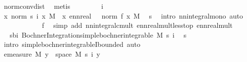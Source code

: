 \begin{isabellebody}
\ norm{\isacharunderscore}{\kern0pt}conv{\isacharunderscore}{\kern0pt}dist\ \isamarkupfalse%
\ metis\isanewline
\ \ \isacommand{{\isacharbraceleft}{\kern0pt}}\isamarkupfalse%
\isanewline
\ \ \ \ \isamarkupfalse%
\ i\isanewline
\ \ \ \ \isamarkupfalse%
\ {\isachardoublequoteopen}{\isacharparenleft}{\kern0pt}{\isasymintegral}\isactrlsup {\isacharplus}{\kern0pt}x{\isachardot}{\kern0pt}\ norm\ {\isacharparenleft}{\kern0pt}s\ i\ x{\isacharparenright}{\kern0pt}\ {\isasympartial}M{\isacharparenright}{\kern0pt}\ {\isasymle}\ {\isacharparenleft}{\kern0pt}{\isasymintegral}\isactrlsup {\isacharplus}{\kern0pt}x{\isachardot}{\kern0pt}\ ennreal\ {\isacharparenleft}{\kern0pt}{}\ {\isacharasterisk}{\kern0pt}\ norm\ {\isacharparenleft}{\kern0pt}f\ x{\isacharparenright}{\kern0pt}{\isacharparenright}{\kern0pt}\ {\isasympartial}M{\isacharparenright}{\kern0pt}{\isachardoublequoteclose}\ \isamarkupfalse%
\ s\ \isamarkupfalse%
\ {\isacharparenleft}{\kern0pt}intro\ nn{\isacharunderscore}{\kern0pt}integral{\isacharunderscore}{\kern0pt}mono{\isacharcomma}{\kern0pt}\ auto{\isacharparenright}{\kern0pt}\isanewline
\ \ \ \ \isamarkupfalse%
\ \isamarkupfalse%
\ {\isachardoublequoteopen}{\isasymdots}\ {\isacharless}{\kern0pt}\ {\isasyminfinity}{\isachardoublequoteclose}\ \isamarkupfalse%
\ f\ \isamarkupfalse%
\ {\isacharparenleft}{\kern0pt}simp\ add{\isacharcolon}{\kern0pt}\ nn{\isacharunderscore}{\kern0pt}integral{\isacharunderscore}{\kern0pt}cmult\ ennreal{\isacharunderscore}{\kern0pt}mult{\isacharunderscore}{\kern0pt}less{\isacharunderscore}{\kern0pt}top\ ennreal{\isacharunderscore}{\kern0pt}mult{\isacharparenright}{\kern0pt}\isanewline
\ \ \ \ \isamarkupfalse%
\ \isamarkupfalse%
\ sbi{\isacharcolon}{\kern0pt}\ {\isachardoublequoteopen}Bochner{\isacharunderscore}{\kern0pt}Integration{\isachardot}{\kern0pt}simple{\isacharunderscore}{\kern0pt}bochner{\isacharunderscore}{\kern0pt}integrable\ M\ {\isacharparenleft}{\kern0pt}s\ i{\isacharparenright}{\kern0pt}{\isachardoublequoteclose}\ \isamarkupfalse%
\ s\ \isamarkupfalse%
\ {\isacharparenleft}{\kern0pt}intro\ simple{\isacharunderscore}{\kern0pt}bochner{\isacharunderscore}{\kern0pt}integrableI{\isacharunderscore}{\kern0pt}bounded{\isacharparenright}{\kern0pt}\ auto\isanewline
\ \ \ \ \isamarkupfalse%
\ {\isachardoublequoteopen}emeasure\ M\ {\isacharbraceleft}{\kern0pt}y\ {\isasymin}\ space\ M{\isachardot}{\kern0pt}\ s\ i\ y\ {\isasymnoteq}\ {}{\isacharbraceright}{\kern0pt}\ {\isasymnoteq}\ {\isasyminfinity}{\isachardoublequoteclose}\ \isamarkupfalse%

\end{isabellebody}
